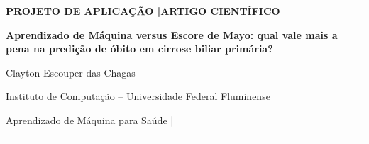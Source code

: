 \documentclass[11pt,a4paper]{article}
\begin{document}
\begin{center}
  {\sffamily\footnotesize\color{azulescuro}\bfseries PROJETO DE APLICAÇÃO \enspace|\enspace ARTIGO CIENTÍFICO}\par
  \vspace{0.65em}
  {\LARGE\sffamily\bfseries Aprendizado de Máquina versus Escore de Mayo: qual vale mais a pena na predição de óbito em cirrose biliar primária?}\par
  \vspace{0.8em}
  {\normalsize Clayton Escouper das Chagas}\par
  \vspace{0.15em}
  {\small Instituto de Computação -- Universidade Federal Fluminense}\par
  {\small\color{cinzasec} Aprendizado de Máquina para Saúde \enspace|}\par
  \vspace{0.85em}
  {\color{linha}\rule{\linewidth}{0.8pt}}
\end{center}
\vspace{-0.7em}










\end{document}
